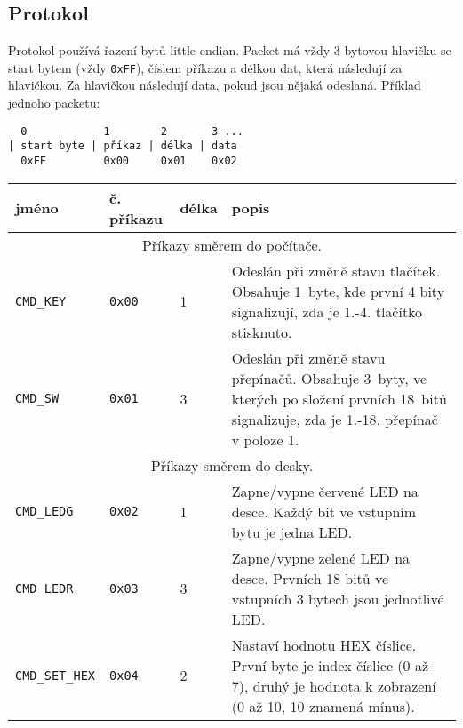 \documentclass[12pt, a4paper, oneside]{article}
\newcommand{\B}{\textbf} %
\begin{document}
\subsection{Protokol}
Protokol používá řazení bytů little-endian. Packet má vždy 3 bytovou hlavičku se start bytem (vždy \verb-0xFF-), číslem příkazu a délkou dat, která následují za hlavičkou. Za hlavičkou následují data, pokud jsou nějaká odeslaná. Příklad jednoho packetu:
\begin{verbatim}
  0            1        2       3-...
| start byte | příkaz | délka | data
  0xFF         0x00     0x01    0x02
\end{verbatim}
\begin{tabular}{ | l | l | l | p{8cm} | }
    \hline
    \B{jméno}      & \B{č. příkazu} & \B{délka} & \B{popis} \\ \hline

    \multicolumn{4}{|c|}{Příkazy směrem do počítače.} \\ \hline
    \verb-CMD_KEY- & \verb-0x00-    & 1         & Odeslán při změně stavu tlačítek. Obsahuje 1~byte, kde první 4 bity signalizují, zda je 1.-4. tlačítko stisknuto. \\ \hline
    \verb-CMD_SW-  & \verb-0x01-    & 3         & Odeslán při změně stavu přepínačů. Obsahuje 3~byty, ve kterých po složení prvních 18~bitů signalizuje, zda je 1.-18. přepínač v poloze 1. \\ \hline

    \multicolumn{4}{|c|}{Příkazy směrem do desky.} \\ \hline
    \verb-CMD_LEDG- & \verb-0x02-    & 1         & Zapne/vypne červené LED na desce. Každý bit ve vstupním bytu je jedna LED. \\ \hline
    \verb-CMD_LEDR- & \verb-0x03-    & 3         & Zapne/vypne zelené LED na desce. Prvních 18 bitů ve vstupních 3 bytech jsou jednotlivé LED. \\ \hline
    \verb-CMD_SET_HEX- & \verb-0x04- & 2         & Nastaví hodnotu HEX číslice. První byte je index číslice (0 až 7), druhý je hodnota k zobrazení (0 až 10, 10 znamená mínus). \\ \hline
\end{tabular}
\end{document}

